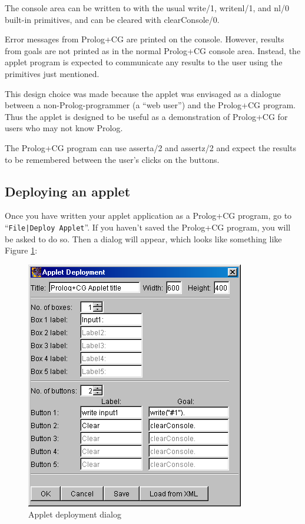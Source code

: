 \documentclass{book}
\begin{document}
The console area can be written to with the usual write/1, writenl/1,
and nl/0 built-in primitives, and can be cleared with clearConsole/0.

Error messages from Prolog+CG are printed on the console.  However,
results from goals are not printed as in the normal Prolog+CG console
area.  Instead, the applet program is expected to communicate any
results to the user using the primitives just mentioned.

This design choice was made because the applet was envisaged as a
dialogue between a non-Prolog-programmer (a ``web user'') and the
Prolog+CG program.  Thus the applet is designed to be useful as a
demonstration of Prolog+CG for users who may not know Prolog.

The Prolog+CG program can use asserta/2 and assertz/2 and expect the
results to be remembered between the user's clicks on the buttons.

\subsection{Deploying an applet}

Once you have written your applet application as a Prolog+CG program,
go to ``\texttt{File|Deploy Applet}''.  If you haven't saved the
Prolog+CG program, you will be asked to do so.  Then a dialog will
appear, which looks like something like Figure \ref{AppletDeploymentDialog}:

\begin{latexonly}

\begin{figure}
\begin{center}
\includegraphics[scale=0.5]{AppletDeploymentDialog.png}
\end{center}
\caption{\label{AppletDeploymentDialog}Applet deployment dialog}
\end{figure}

\end{latexonly}
\end{document}
